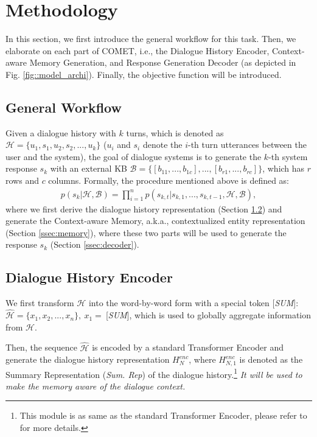 \documentclass[11pt]{article}
\begin{document}
\section{Methodology}
\label{sec:methodology}

In this section, we first introduce the general workflow for this task. Then, we elaborate on each part of COMET, i.e., the Dialogue History Encoder, Context-aware Memory Generation, and Response Generation Decoder (as depicted in Fig. \ref{fig::model_archi}). Finally, the objective function will be introduced.


\subsection{General Workflow}
\label{ssec:workflow}

Given a dialogue history with $k$ turns, which is denoted as $\mathcal{H} = \{u_1, s_1, u_2, s_2, ..., u_k\}$ ($u_i$ and $s_i$ denote the $i$-th turn utterances between the user and the system), the goal of dialogue systems is to generate the $k$-th system response $s_k$ with an external KB $\mathcal{B}=\{[b_{11}, ..., b_{1c}], ..., [b_{r1}, ..., b_{rc}]\}$, which has $r$ rows and $c$ columns. Formally, the procedure mentioned above is defined as: 
\begin{align}
    p(s_k|\mathcal{H}, \mathcal{B}) = \prod_{i=1}^{n}p(s_{k,t}|s_{k,1}, ..., s_{k,t-1}, \mathcal{H}, \mathcal{B}), \nonumber
\end{align}
where we first derive the dialogue history representation (Section \ref{ssec:encoder}) and generate the Context-aware Memory, a.k.a., contextualized entity representation (Section \ref{ssec:memory}), where these two parts will be used to generate the response $s_k$ (Section \ref{ssec:decoder}).


\subsection{Dialogue History Encoder}
\label{ssec:encoder}

We first transform $\mathcal{H}$ into the word-by-word form with a special token [\textit{SUM}]: $\mathcal{\hat{H}} = \{x_1, x_2, ..., x_n\},\ x_1=\ $[\textit{SUM}], which is used to globally aggregate information from $\mathcal{H}$. 

Then, the sequence $\mathcal{\hat{H}}$ is encoded by a standard Transformer Encoder and generate the dialogue history representation $H_{N}^{enc}$, where $H_{N,1}^{enc}$ is denoted as the Summary Representation (\textit{Sum. Rep}) of the dialogue history.\footnote{This module is as same as the standard Transformer Encoder, please refer to \cite{vaswani-2017-attention} for more details.}
\textit{It will be used to make the memory aware of the dialogue context.}
\end{document}
